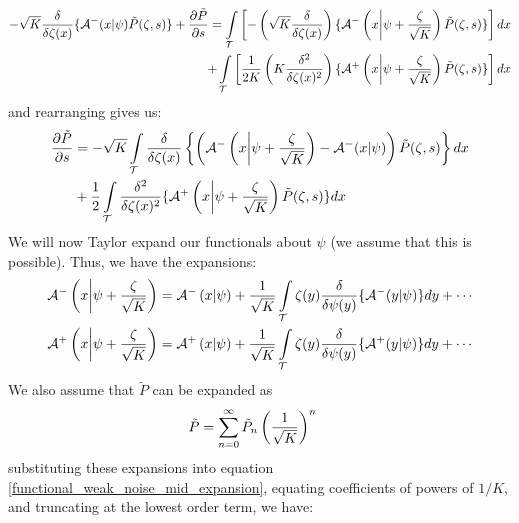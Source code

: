 \begin{equation*}
\begin{split}
-\sqrt{K}\frac{\delta}{\delta \zeta(x)}\{\mathcal{A}^{-}(x|\psi)\Tilde{P}(\zeta,s)\} + \frac{\partial \Tilde{P}}{\partial s} = \int\limits_{\mathcal{T}}\left[-
    \left(\sqrt{K}\frac{\delta }{\delta \zeta(x)}\right)\{\mathcal{A}^{-}\left(x\bigg{|}\psi+\frac{\zeta}{\sqrt{K}}\right)\tilde{P}(\zeta,s)\}\right]dx \\
    + \int\limits_{\mathcal{T}}\left[\frac{1}{2K}\left(K\frac{\delta^2}{\delta\zeta(x)^2}\right)\{\mathcal{A}^{+}\left(x\bigg{|}\psi+\frac{\zeta}{\sqrt{K}}\right)\Tilde{P}(\zeta,s)\}\right]dx    
\end{split}
\end{equation*}
and rearranging gives us:
\begin{align}
\label{functional_weak_noise_mid_expansion}
\begin{split}
\frac{\partial \Tilde{P}}{\partial s} &= -\sqrt{K}\int\limits_{\mathcal{T}}\frac{\delta }{\delta \zeta(x)}\left\{\left(\mathcal{A}^{-}\left(x\bigg{|}\psi+\frac{\zeta}{\sqrt{K}}\right)-\mathcal{A}^{-}(x|\psi)\right)\Tilde{P}(\zeta,s)\right\}dx\\
&+\frac{1}{2}\int\limits_{\mathcal{T}}\frac{\delta^2}{\delta\zeta(x)^2}\{\mathcal{A}^{+}\left(x\bigg{|}\psi+\frac{\zeta}{\sqrt{K}}\right)\Tilde{P}(\zeta,s)\}dx
\end{split}
\end{align}
We will now Taylor expand our functionals about $\psi$ (we assume that this is possible). Thus, we have the expansions:
\begin{align*}
    \mathcal{A}^{-}\left(x\bigg{|}\psi+\frac{\zeta}{\sqrt{K}}\right) &= \mathcal{A}^{-}\left(x|\psi\right) + \frac{1}{\sqrt{K}}\int\limits_{\mathcal{T}}\zeta(y)\frac{\delta}{\delta \psi(y)}\{\mathcal{A}^{-}(y|\psi)\}dy + \cdots\\
    \mathcal{A}^{+}\left(x\bigg{|}\psi+\frac{\zeta}{\sqrt{K}}\right) &= \mathcal{A}^{+}\left(x|\psi\right) + \frac{1}{\sqrt{K}}\int\limits_{\mathcal{T}}\zeta(y)\frac{\delta}{\delta \psi(y)}\{\mathcal{A}^{+}(y|\psi)\}dy + \cdots
\end{align*}
We also assume that $\tilde{P}$ can be expanded as
\begin{align*}
     \Tilde{P} &= \sum\limits_{n=0}^{\infty}\Tilde{P}_n\left(\frac{1}{\sqrt{K}}\right)^n
\end{align*}
substituting these expansions into equation \eqref{functional_weak_noise_mid_expansion}, equating coefficients of powers of $1/K$, and truncating at the lowest order term, we have:
